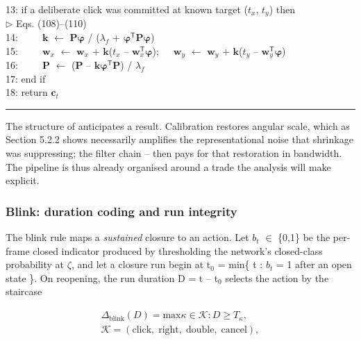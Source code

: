 \begin{algorithm}[htbp]
{13: if a deliberate click was committed at known target ($t_{x}$, $t_{y}$) then~~~~~~~~~~~~$\triangleright$ Eqs. (108)--(110) \\
14:~~~~~$\mathbf{k}$ $\leftarrow$ $\mathbf{P}\boldsymbol{\varphi}$ / ($\lambda_{f}$ + $\boldsymbol{\varphi}^{\mathsf{T}}\mathbf{P}\boldsymbol{\varphi}$) \\
15:~~~~~$\mathbf{w}_{x}$ $\leftarrow$ $\mathbf{w}_{x}$ + $\mathbf{k}$($t_{x}$ -- $\mathbf{w}_{x}^{\mathsf{T}}\boldsymbol{\varphi}$);~~~$\mathbf{w}_{y}$ $\leftarrow$ $\mathbf{w}_{y}$ + $\mathbf{k}$($t_{y}$ -- $\mathbf{w}_{y}^{\mathsf{T}}\boldsymbol{\varphi}$) \\
16:~~~~~$\mathbf{P}$ $\leftarrow$ ($\mathbf{P}$ -- $\mathbf{k}\boldsymbol{\varphi}^{\mathsf{T}}\mathbf{P}$) / $\lambda_{f}$ \\
17: end if \\
18: return $\mathbf{c}_{t}$
\par}
\vspace{3pt}\hrule
\end{algorithm}

The structure of  anticipates a result. Calibration  restores angular scale, which as Section 5.2.2 shows necessarily amplifies the representational noise that shrinkage was suppressing; the filter chain -- then pays for that restoration in bandwidth. The pipeline is thus already organised around a trade the analysis will make explicit.

\subsubsection{Blink: duration coding and run integrity}

The blink rule maps a \emph{sustained} closure to an action. Let $b_{t}$ $\in$ \{0,1\} be the per-frame closed indicator produced by thresholding the network's closed-class probability at $\zeta$, and let a closure run begin at t$_{0}$ = min\{ t : $b_{t}$ = 1 after an open state \}. On reopening, the run duration D = t -- t$_{0}$ selects the action by the staircase

\begin{equation}
\label{eq:118}
\begin{aligned}
\Delta _{\mathrm{blink}}(D) = \mathrm{max} { \kappa \in \mathcal{K} : D \geq T_{\kappa} } , \\
\mathcal{K} = ( \text{click}, \;\text{right}, \;\text{double}, \;\text{cancel} ),
\end{aligned}
\end{equation}

